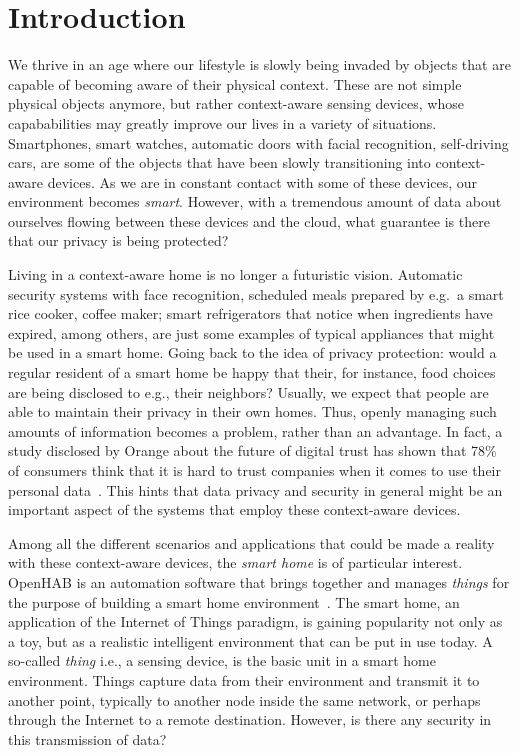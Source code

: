 \documentclass[12pt]{article}
\begin{document}
\newpage
\section{Introduction}
We thrive in an age where our lifestyle is slowly being invaded by objects that are capable of becoming aware of their physical context. These are not simple physical objects anymore, but rather context-aware sensing devices, whose capababilities may greatly improve our lives in a variety of situations. Smartphones, smart watches, automatic doors with facial recognition, self-driving cars, are some of the objects that have been slowly transitioning into context-aware devices. As we are in constant contact with some of these devices, our environment becomes \emph{smart}. However, with a tremendous amount of data about ourselves flowing between these devices and the cloud, what guarantee is there that our privacy is being protected?

Living in a context-aware home is no longer a futuristic vision. Automatic security systems with face recognition, scheduled meals prepared by e.g.\ a smart rice cooker, coffee maker; smart refrigerators that notice when ingredients have expired, among others, are just some examples of typical appliances that might be used in a smart home. Going back to the idea of privacy protection: would a regular resident of a smart home be happy that their, for instance, food choices are being disclosed to e.g., their neighbors? Usually, we expect that people are able to maintain their privacy in their own homes. Thus, openly managing such amounts of information becomes a problem, rather than an advantage. In fact, a study disclosed by Orange about the future of digital trust has shown that 78\% of consumers think that it is hard to trust companies when it comes to use their personal data~\cite{orange}. This hints that data privacy and security in general might be an important aspect of the systems that employ these context-aware devices. 

Among all the different scenarios and applications that could be made a reality with these context-aware devices, the \emph{smart home} is of particular interest. OpenHAB is an automation software that brings together and manages \emph{things} for the purpose of building a smart home environment~\cite{openhab_02}. The smart home, an application of the Internet of Things paradigm, is gaining popularity not only as a toy, but as a realistic intelligent environment that can be put in use today. A so-called \emph{thing} i.e., a sensing device, is the basic unit in a smart home environment. Things capture data from their environment and transmit it to another point, typically to another node inside the same network, or perhaps through the Internet to a remote destination. However, is there any security in this transmission of data?
\end{document}
